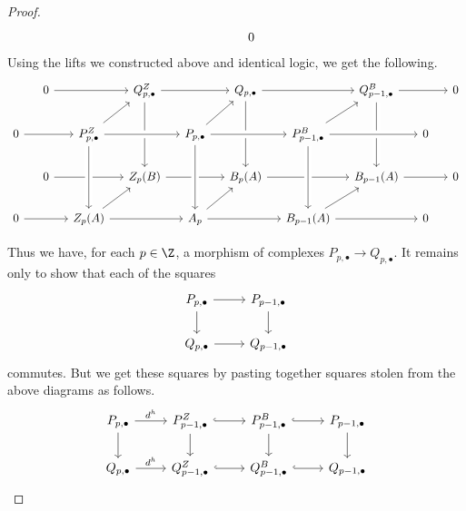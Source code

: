 \documentclass[main.tex]{subfiles}
\begin{document}
\begin{proof}
\begin{equation*}
\begin{tikzcd}[column sep=small]
      && 0
    \end{tikzcd}
  \end{equation*}
  Using the lifts we constructed above and identical logic, we get the following.
  \begin{equation*}
    \begin{tikzcd}[column sep=small]
      & 0
      \arrow[rr]
      && Q^{Z}_{p,\bullet}
      \arrow[rr]
      \arrow[dd, crossing over]
      && Q_{p,\bullet}
      \arrow[rr]
      \arrow[dd, crossing over]
      && Q^{B}_{p-1,\bullet}
      \arrow[rr]
      \arrow[dd, crossing over]
      && 0
      \\
      0
      \arrow[rr, crossing over]
      && P^{Z}_{p,\bullet}
      \arrow[rr, crossing over]
      \arrow[ur]
      && P_{p,\bullet}
      \arrow[rr, crossing over]
      \arrow[ur]
      && P^{B}_{p-1,\bullet}
      \arrow[rr, crossing over]
      \arrow[ur]
      && 0
      \\
      & 0
      \arrow[rr]
      && Z_{p}(B)
      \arrow[rr]
      && B_{p}(A)
      \arrow[rr]
      && B_{p-1}(A)
      \arrow[rr]
      && 0
      \\
      0
      \arrow[rr]
      && Z_{p}(A)
      \arrow[rr]
      \arrow[from=uu, crossing over]
      \arrow[ur]
      && A_{p}
      \arrow[rr]
      \arrow[from=uu, crossing over]
      \arrow[ur]
      && B_{p-1}(A)
      \arrow[rr]
      \arrow[from=uu, crossing over]
      \arrow[ur]
      && 0
    \end{tikzcd}
  \end{equation*}

  Thus we have, for each $p \in \Z$, a morphism of complexes $P_{p,\bullet} \to Q_{p,\bullet}$. It remains only to show that each of the squares
  \begin{equation*}
    \begin{tikzcd}
      P_{p,\bullet}
      \arrow[r]
      \arrow[d]
      & P_{p-1,\bullet}
      \arrow[d]
      \\
      Q_{p,\bullet}
      \arrow[r]
      & Q_{p-1,\bullet}
    \end{tikzcd}
  \end{equation*}
  commutes. But we get these squares by pasting together squares stolen from the above diagrams as follows.
  \begin{equation*}
    \begin{tikzcd}
      P_{p,\bullet}
      \arrow[r, "d^{h}"]
      \arrow[d]
      & P^{Z}_{p-1,\bullet}
      \arrow[r, hook]
      \arrow[d]
      & P^{B}_{p-1,\bullet}
      \arrow[r, hook]
      \arrow[d]
      & P_{p-1,\bullet}
      \arrow[d]
      \\
      Q_{p,\bullet}
      \arrow[r, "d^{h}"]
      & Q^{Z}_{p-1,\bullet}
      \arrow[r, hook]
      & Q^{B}_{p-1,\bullet}
      \arrow[r, hook]
      & Q_{p-1,\bullet}
    \end{tikzcd}
  \end{equation*}
\end{proof}
\end{document}

